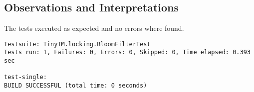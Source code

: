 
\subsection{Observations and Interpretations}

\par
The tests executed as expected and no errors where found.
\begin{lstlisting}[frame=single,breaklines=true]
Testsuite: TinyTM.locking.BloomFilterTest
Tests run: 1, Failures: 0, Errors: 0, Skipped: 0, Time elapsed: 0.393 sec

test-single:
BUILD SUCCESSFUL (total time: 0 seconds)
\end{lstlisting}




